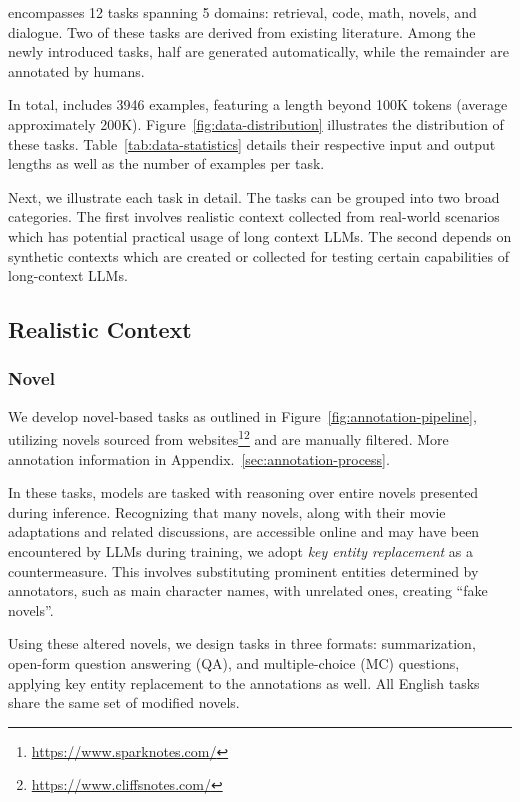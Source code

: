 \OURSSPACE encompasses 12 tasks spanning 5 domains: retrieval, code, math, novels, and dialogue. Two of these tasks are derived from existing literature\cite{Mohtashami2023LandmarkAR,lost-in-the-middle}. Among the newly introduced tasks, half are generated automatically, while the remainder are annotated by humans. 

In total, \OURSSPACE includes 3946 examples, featuring a length beyond 100K tokens (average approximately 200K). Figure~\ref{fig:data-distribution} illustrates the distribution of these tasks. Table~\ref{tab:data-statistics} details their respective input and output lengths as well as the number of examples per task. 

Next, we illustrate each task in detail. The tasks can be grouped into two broad categories. The first involves realistic context collected from real-world scenarios which has potential practical usage of long context LLMs. The second depends on synthetic contexts which are created or collected for testing certain capabilities of long-context LLMs. 

\subsection{Realistic Context}

\subsubsection{Novel}

We develop novel-based tasks as outlined in Figure~\ref{fig:annotation-pipeline}, utilizing novels sourced from websites\footnote{\label{SparkNotes}\url{https://www.sparknotes.com/}}\footnote{\label{CliffsNotes}\url{https://www.cliffsnotes.com/}} and are manually filtered. More annotation information in Appendix.~\ref{sec:annotation-process}.

In these tasks, models are tasked with reasoning over entire novels presented during inference. Recognizing that many novels, along with their movie adaptations and related discussions, are accessible online and may have been encountered by LLMs during training, we adopt \textit{key entity replacement} as a countermeasure. This involves substituting prominent entities determined by annotators, such as main character names, with unrelated ones, creating ``fake novels''.

Using these altered novels, we design tasks in three formats: summarization, open-form question answering (QA), and multiple-choice (MC) questions, applying key entity replacement to the annotations as well. All English tasks share the same set of modified novels.

